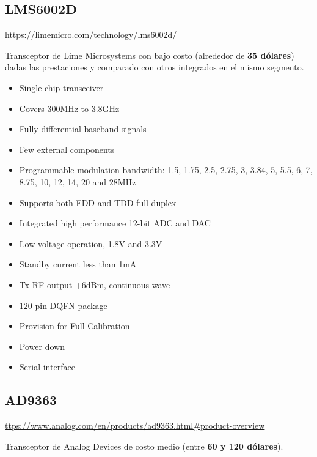 \documentclass[a4paper,12pt]{report} %
\begin{document}
\subsection{LMS6002D}

\url{https://limemicro.com/technology/lms6002d/}

Transceptor de Lime Microsystems con bajo costo (alrededor de \textbf{35 dólares}) dadas las prestaciones y comparado con otros integrados en el mismo segmento. 

\begin{itemize}
	\item Single chip transceiver
	\item Covers 300MHz to 3.8GHz
	\item Fully differential baseband signals
	\item Few external components
	\item Programmable modulation bandwidth: 1.5, 1.75, 2.5, 2.75, 3, 3.84, 5, 5.5, 6, 7, 8.75, 10, 12, 14, 20 and 28MHz
	\item Supports both FDD and TDD full duplex
	\item Integrated high performance 12-bit ADC and DAC
	\item Low voltage operation, 1.8V and 3.3V
	\item Standby current less than 1mA
	\item Tx RF output +6dBm, continuous wave
	\item 120 pin DQFN package
	\item Provision for Full Calibration
	\item Power down
	\item Serial interface
\end{itemize}

\subsection{AD9363}

\url{ttps://www.analog.com/en/products/ad9363.html#product-overview}

Transceptor de Analog Devices de costo medio (entre \textbf{60 y 120 dólares}). 
\end{document}
